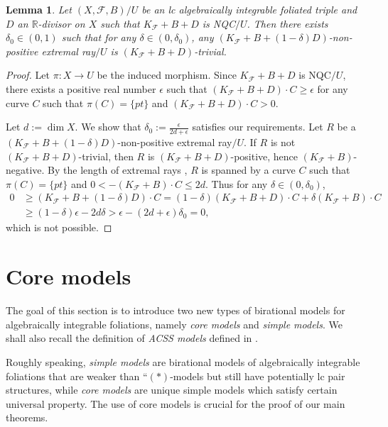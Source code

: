 \documentclass[11pt]{amsart}
\numberwithin{equation}{section}
\newcommand{\Rr}{\mathbb{R}}
\newcommand{\Ff}{\mathcal{F}}
\newtheorem{lem}[thm]{Lemma}
\theoremstyle{definition}
\theoremstyle{definition}
\theoremstyle{definition}
\begin{document}
\begin{lem}\label{lem: trivial ray when -delta triple}
Let $(X,\Ff,B)/U$ be an lc algebraically integrable foliated triple and $D$ an $\Rr$-divisor on $X$ such that  $K_{\Ff}+B+D$ is NQC$/U$. Then there exists $\delta_0\in (0,1)$ such that for any $\delta\in (0,\delta_0)$, any $(K_{\Ff}+B+(1-\delta)D)$-non-positive extremal ray$/U$ is $(K_{\Ff}+B+D)$-trivial.
\end{lem}
\begin{proof}
Let $\pi: X\rightarrow U$ be the induced morphism. Since $K_{\Ff}+B+D$ is NQC$/U$, there exists a positive real number $\epsilon$ such that $(K_{\Ff}+B+D)\cdot C\geq\epsilon$ for any curve $C$ such that $\pi(C)=\{pt\}$ and $(K_{\Ff}+B+D)\cdot C>0$. 

Let $d:=\dim X$. We show that $\delta_0:=\frac{\epsilon}{2d+\epsilon}$ satisfies our requirements. Let $R$ be a $(K_{\Ff}+B+(1-\delta)D)$-non-positive extremal ray$/U$. If $R$ is not $(K_{\Ff}+B+D)$-trivial, then $R$ is $(K_{\Ff}+B+D)$-positive, hence $(K_{\Ff}+B)$-negative. By the length of extremal rays \cite[Theorem 2.3.1]{CHLX23}, $R$ is spanned by a curve $C$ such that $\pi(C)=\{pt\}$ and $0<-(K_{\Ff}+B)\cdot C\leq 2d$. Thus for any $\delta\in (0,\delta_0)$,
\begin{align*}
   0&\ge(K_{\Ff}+B+(1-\delta)D)\cdot C=(1-\delta)(K_{\Ff}+B+D)\cdot C+\delta(K_{\Ff}+B)\cdot C\\
   &\geq (1-\delta)\epsilon-2d\delta>\epsilon-(2d+\epsilon)\delta_0=0,
\end{align*}
which is not possible.
\end{proof}









\section{Core models}\label{sec: core model}

The goal of this section is to introduce two new types of birational models for algebraically integrable foliations, namely \emph{core models} and \emph{simple models}. We shall also recall the definition of \emph{ACSS models} defined in \cite{CHLX23,DLM23}.

Roughly speaking, \emph{simple models} are birational models of algebraically integrable foliations that are weaker than ``$(*)$-models but still have potentially lc pair structures, while \emph{core models} are unique simple models which satisfy certain universal property. The use of core models is crucial for the proof of our main theorems. 
\end{document}
